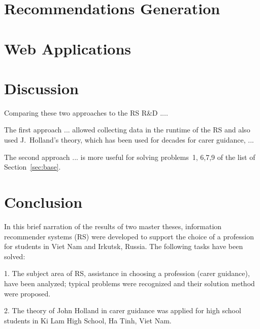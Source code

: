 \documentclass[conference,a4]{IEEEtran}
\begin{document}
\section{Recommendations Generation}
\label{sec:proc-recs}






\section{Web Applications}

\section{Discussion}
\label{sec:disc}

Comparing these two approaches to the RS R\&D ....

The first approach ... allowed collecting data in the runtime of the RS and also used J.~Holland's theory, which has been used for decades for carer guidance, ...

The second approach ... is more useful for solving problems~1, 6,7,9 of the list of Section~\ref{sec:base}.



\section{Conclusion}
\label{sec:conc}


In this brief narration of the results of two master theses, information recommender systems (RS) were developed to support the choice of a profession for students in Viet Nam and Irkutsk, Russia. The following tasks have been solved:

1. The subject area of ​​RS, assistance in choosing a profession (carer guidance), have been analyzed; typical problems were recognized and their solution method were proposed.

2. The theory of John Holland in carer guidance was applied for high school students in Ki Lam High School, Ha Tinh, Viet Nam.
\end{document}
